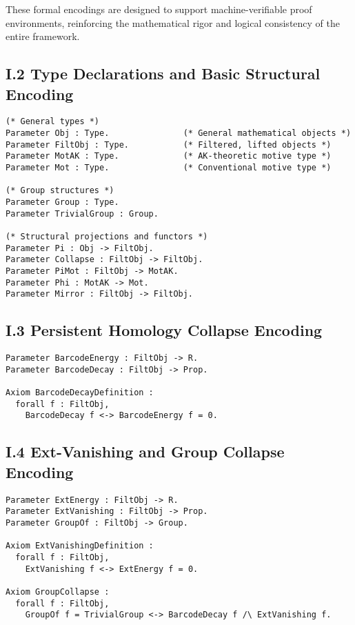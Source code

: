 \documentclass[11pt]{article}
\begin{document}
These formal encodings are designed to support machine-verifiable proof environments, reinforcing the mathematical rigor and logical consistency of the entire framework.

\subsection*{I.2 Type Declarations and Basic Structural Encoding}

\begin{lstlisting}[language=Coq, caption=Basic Type Declarations]
(* General types *)
Parameter Obj : Type.               (* General mathematical objects *)
Parameter FiltObj : Type.           (* Filtered, lifted objects *)
Parameter MotAK : Type.             (* AK-theoretic motive type *)
Parameter Mot : Type.               (* Conventional motive type *)

(* Group structures *)
Parameter Group : Type.
Parameter TrivialGroup : Group.

(* Structural projections and functors *)
Parameter Pi : Obj -> FiltObj.
Parameter Collapse : FiltObj -> FiltObj.
Parameter PiMot : FiltObj -> MotAK.
Parameter Phi : MotAK -> Mot.
Parameter Mirror : FiltObj -> FiltObj.
\end{lstlisting}

\subsection*{I.3 Persistent Homology Collapse Encoding}

\begin{lstlisting}[language=Coq, caption=Persistent Homology Collapse]
Parameter BarcodeEnergy : FiltObj -> R.
Parameter BarcodeDecay : FiltObj -> Prop.

Axiom BarcodeDecayDefinition :
  forall f : FiltObj,
    BarcodeDecay f <-> BarcodeEnergy f = 0.
\end{lstlisting}

\subsection*{I.4 Ext-Vanishing and Group Collapse Encoding}

\begin{lstlisting}[language=Coq, caption=Ext-Vanishing and Group Collapse]
Parameter ExtEnergy : FiltObj -> R.
Parameter ExtVanishing : FiltObj -> Prop.
Parameter GroupOf : FiltObj -> Group.

Axiom ExtVanishingDefinition :
  forall f : FiltObj,
    ExtVanishing f <-> ExtEnergy f = 0.

Axiom GroupCollapse :
  forall f : FiltObj,
    GroupOf f = TrivialGroup <-> BarcodeDecay f /\ ExtVanishing f.
\end{lstlisting}
\end{document}
